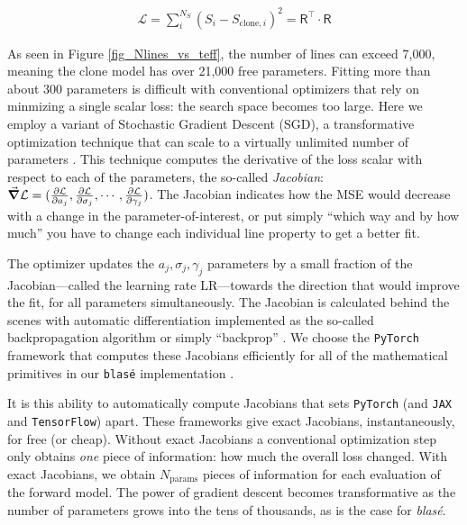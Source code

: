 \documentclass[twocolumn]{aastex631}
\begin{document}
\begin{eqnarray}
    \mathcal{L} = \sum_i^{N_S} (S_i - S_{\mathrm{clone},i})^2 = \mathsf{R^\intercal}\cdot \mathsf{R} \label{simpleLikelihood}
\end{eqnarray}


As seen in Figure \ref{fig_Nlines_vs_teff}, the number of lines can exceed 7,000, meaning the clone model has over 21,000 free parameters. Fitting more than about 300 parameters is difficult with conventional optimizers that rely on minmizing a single scalar loss: the search space becomes too large.  Here we employ a variant of Stochastic Gradient Descent (SGD), a transformative optimization technique that can scale to a virtually unlimited number of parameters \citep{2016arXiv160904747R}. This technique computes the derivative of the loss scalar with respect to each of the parameters, the so-called \emph{Jacobian}: $\grad \mathcal{L} = (\frac{\partial \mathcal{L}}{\partial a_j}, \frac{\partial \mathcal{L}}{\partial \sigma_j}, \cdots, \frac{\partial \mathcal{L}}{\partial \gamma_j})$. The Jacobian indicates how the MSE would decrease with a change in the parameter-of-interest, or put simply ``which way and by how much'' you have to change each individual line property to get a better fit.

The optimizer updates the $a_j, \sigma_j, \gamma_j$ parameters by a small fraction of the Jacobian---called the learning rate LR---towards the direction that would improve the fit, for all parameters simultaneously. The Jacobian is calculated behind the scenes with automatic differentiation implemented as the so-called backpropagation algorithm or simply ``backprop'' \citep{2015arXiv150205767G}. We choose the \texttt{PyTorch} framework that computes these Jacobians efficiently for all of the mathematical primitives in our \texttt{blas\'e} implementation \citep{2019arXiv191201703P}.

It is this ability to automatically compute Jacobians that sets \texttt{PyTorch} (and \texttt{JAX} and \texttt{TensorFlow}) apart.  These frameworks give exact Jacobians, instantaneously, for free (or cheap).  Without exact Jacobians a conventional optimization step only obtains \emph{one} piece of information: how much the overall loss changed.  With exact Jacobians, we obtain $N_\mathrm{params}$ pieces of information for each evaluation of the forward model.  The power of gradient descent becomes transformative as the number of parameters grows into the tens of thousands, as is the case for \emph{blas\'e}. 
\end{document}

